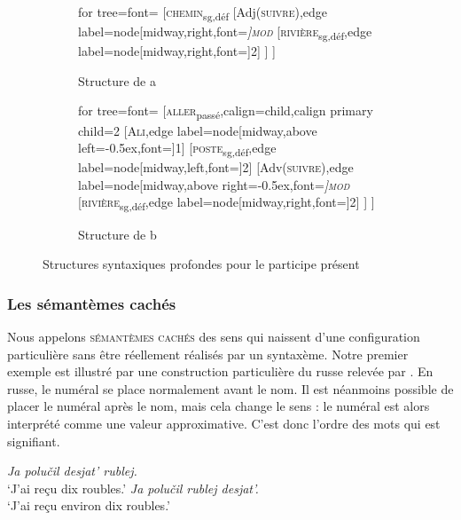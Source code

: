 \begin{figure}
	\begin{subfigure}[b]{0.5\textwidth}
		\centering
		\begin{forest} for tree={font=\normalfont}
			[\textsc{chemin}\textsubscript{sg,déf}
			[Adj(\textsc{suivre}),edge label={node[midway,right,font=\footnotesize\itshape]{\textsc{mod}}}
			[\textsc{rivière}\textsubscript{sg,déf},edge label={node[midway,right,font=\footnotesize]{2}}]
			]
			]
		\end{forest}
		\caption{Structure de a}
	\end{subfigure}%
	\hfill
	\begin{subfigure}[b]{0.5\textwidth}
		\centering
		\begin{forest} for tree={font=\normalfont}
			[\textsc{aller}\textsubscript{passé},calign=child,calign primary child=2
				[\textsc{Ali},edge label={node[midway,above left=-0.5ex,font=\footnotesize]{1}}]
				[\textsc{poste}\textsubscript{sg,déf},edge label={node[midway,left,font=\footnotesize]{2}}]
				[Adv(\textsc{suivre}),edge label={node[midway,above right=-0.5ex,font=\footnotesize\itshape]{\textsc{mod}}}
					[\textsc{rivière}\textsubscript{sg,déf},edge label={node[midway,right,font=\footnotesize]{2}}]
				]
			]
		\end{forest}
		\caption{Structure de b}
	\end{subfigure}
\caption{Structures syntaxiques profondes pour le participe présent\label{fig:13-suivant}}
\end{figure}

\subsubsection{Les sémantèmes cachés} 
Nous appelons \textsc{sémantèmes cachés} des sens qui naissent d’une configuration particulière sans être réellement réalisés par un syntaxème. Notre premier exemple est illustré par une construction particulière du russe relevée par \cite[141]{melcuk1988dependency}. En russe, le numéral se place normalement avant le nom. Il est néanmoins possible de placer le numéral après le nom, mais cela change le sens : le numéral est alors interprété comme une valeur approximative. C’est donc l’ordre des mots qui est signifiant. 

\ea\label{ex:13-approx}  
\ea \textit{Ja polučil desjat’ rublej.}\\ 
\glt ‘J’ai reçu dix roubles.’
\ex \textit{Ja polučil rublej desjat’.}\\ 
\glt ‘J’ai reçu environ dix roubles.’\z\z

